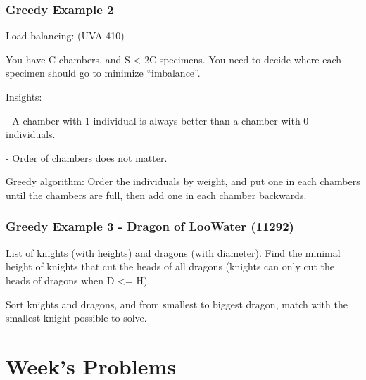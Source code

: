 \documentclass{beamer}
\begin{document}
\begin{frame}
  \frametitle{Greedy Example 2}
  Load balancing: (UVA 410)

  You have C chambers, and S < 2C specimens. You need to decide where
  each specimen should go to minimize ``imbalance''.

  Insights:

  - A chamber with 1 individual is always better than a chamber with 0
  individuals.

  - Order of chambers does not matter.


  Greedy algorithm: Order the individuals by weight, and 
  put one in each chambers until the chambers are full, then add one
  in each chamber backwards.
\end{frame}

\begin{frame}
  \frametitle{Greedy Example 3 - Dragon of LooWater (11292)}
  List of knights (with heights) and dragons (with diameter). Find the 
  minimal height of knights that cut the heads of all dragons 
  (knights can only cut the heads of dragons when D <= H).

  Sort knights and dragons, and from smallest to biggest dragon, 
  match with the smallest knight possible to solve.
\end{frame}




\section{Week's Problems}
\end{document}
